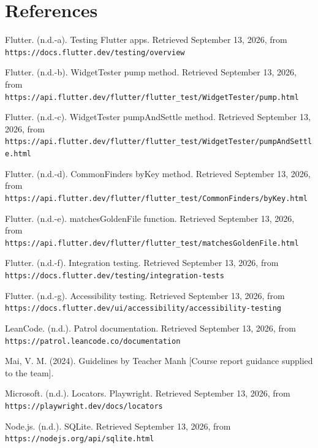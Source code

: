 \documentclass[12pt,a4paper,oneside]{report}
\begin{document}
\chapter*{References}
\noindent\hangindent=0.75cm Flutter. (n.d.-a). Testing Flutter apps. Retrieved September 13, 2026, from \nolinkurl{https://docs.flutter.dev/testing/overview}\par\medskip
\noindent\hangindent=0.75cm Flutter. (n.d.-b). WidgetTester pump method. Retrieved September 13, 2026, from \nolinkurl{https://api.flutter.dev/flutter/flutter_test/WidgetTester/pump.html}\par\medskip
\noindent\hangindent=0.75cm Flutter. (n.d.-c). WidgetTester pumpAndSettle method. Retrieved September 13, 2026, from \nolinkurl{https://api.flutter.dev/flutter/flutter_test/WidgetTester/pumpAndSettle.html}\par\medskip
\noindent\hangindent=0.75cm Flutter. (n.d.-d). CommonFinders byKey method. Retrieved September 13, 2026, from \nolinkurl{https://api.flutter.dev/flutter/flutter_test/CommonFinders/byKey.html}\par\medskip
\noindent\hangindent=0.75cm Flutter. (n.d.-e). matchesGoldenFile function. Retrieved September 13, 2026, from \nolinkurl{https://api.flutter.dev/flutter/flutter_test/matchesGoldenFile.html}\par\medskip
\noindent\hangindent=0.75cm Flutter. (n.d.-f). Integration testing. Retrieved September 13, 2026, from \nolinkurl{https://docs.flutter.dev/testing/integration-tests}\par\medskip
\noindent\hangindent=0.75cm Flutter. (n.d.-g). Accessibility testing. Retrieved September 13, 2026, from \nolinkurl{https://docs.flutter.dev/ui/accessibility/accessibility-testing}\par\medskip
\noindent\hangindent=0.75cm LeanCode. (n.d.). Patrol documentation. Retrieved September 13, 2026, from \nolinkurl{https://patrol.leancode.co/documentation}\par\medskip
\noindent\hangindent=0.75cm Mai, V. M. (2024). Guidelines by Teacher Manh [Course report guidance supplied to the team].\par\medskip
\noindent\hangindent=0.75cm Microsoft. (n.d.). Locators. Playwright. Retrieved September 13, 2026, from \nolinkurl{https://playwright.dev/docs/locators}\par\medskip
\noindent\hangindent=0.75cm Node.js. (n.d.). SQLite. Retrieved September 13, 2026, from \nolinkurl{https://nodejs.org/api/sqlite.html}\par\medskip
\end{document}
